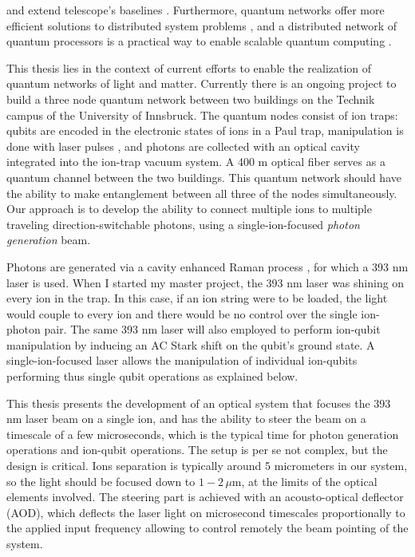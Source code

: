 \documentclass[english, a4paper, 12pt, twoside]{book}
\numberwithin{equation}{section} %
\begin{document}
and extend telescope's baselines \cite{telescope}. Furthermore, quantum networks offer more efficient solutions to distributed system problems \cite{distributedcomputing}, and a distributed network of quantum processors is a practical way to enable scalable quantum computing \cite{PhysRevA.89.022317}.\par
This thesis lies in the context of current efforts to enable the realization of quantum networks of light and matter. Currently there is an ongoing project to build a three node quantum network between two buildings on the Technik campus of the University of Innsbruck. The quantum nodes consist of ion traps: qubits are encoded in the electronic states of ions in a Paul trap, manipulation is done with laser pulses \cite{ionquantumcomputer}, and photons are collected with an optical cavity integrated into the ion-trap vacuum system. A 400 m optical fiber serves as a quantum channel between the two buildings. This quantum network should have the ability to make entanglement between all three of the nodes simultaneously. Our approach is to develop the ability to connect multiple ions to multiple traveling direction-switchable photons, using a single-ion-focused \emph{photon generation} beam. \par
Photons are generated via a cavity enhanced Raman process \cite{stuteinterface}, for which a 393 nm laser is used. When I started my master project, the 393 nm laser was shining on every ion in the trap. In this case, if an ion string were to be loaded, the light would couple to every ion and there would be no control over the single ion-photon pair. The same 393 nm laser will also employed to perform ion-qubit manipulation by inducing an AC Stark shift on the qubit's ground state. A single-ion-focused laser allows the manipulation of individual ion-qubits performing thus single qubit operations as explained below.\par
This thesis presents the development of an optical system that focuses the 393 nm laser beam on a single ion, and has the ability to steer the beam on a timescale of a few microseconds, which is the typical time for photon generation operations and ion-qubit operations. The setup is per se not complex, but the design is critical. Ions separation is typically around 5 micrometers in our system, so the light should be focused down to $1-2\,\mu$m, at the limits of the optical elements involved. The steering part is achieved with an acousto-optical deflector (AOD), which deflects the laser light on microsecond timescales proportionally to the applied input frequency allowing to control remotely the beam pointing of the system.
\end{document}
